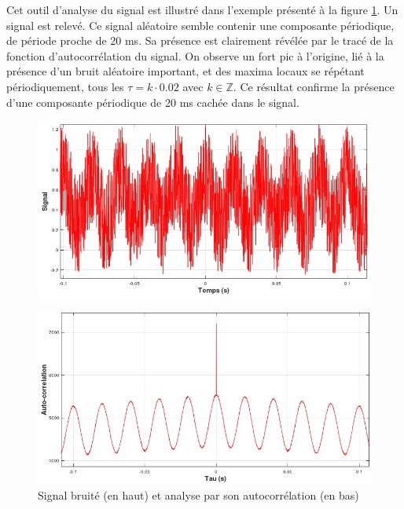 	Cet outil d'analyse du signal est illustré dans l'exemple présenté à la figure \ref{Fig:Mesure_autocorr_1}. Un signal est relevé. Ce signal aléatoire semble contenir une composante périodique, de période proche de 20 ms. Sa présence est clairement révélée par le tracé de la fonction d'autocorrélation du signal. On observe un fort pic à l'origine, lié à la présence d'un bruit aléatoire important, et des maxima locaux se répétant périodiquement, tous les $\tau=k \cdot 0.02$ avec $k \in \mathbb{Z}$. Ce résultat confirme la présence d'une composante périodique de 20 ms cachée dans le signal.
	
	\begin{figure}[h!]
		\centering
		\includegraphics[scale=0.6]{images/Mesure_autocorr_1.jpg}
	\end{figure}

	\begin{figure}[h!]
		\centering
		\includegraphics[scale=0.6]{images/Mesure_autocorr_2.jpg}
		\caption{Signal bruité (en haut) et analyse par son autocorrélation (en bas)}	
		\label{Fig:Mesure_autocorr_1} 
	\end{figure}
	
	
	
